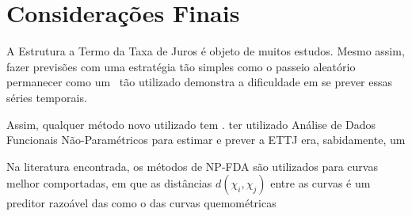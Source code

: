 \documentclass[
	12pt,				%
	openright,			%
	oneside,			%
	a4paper,			%
	english,			%
	brazil				%
	]{dissertacao-ufrgs-abntex2}
\begin{document}

%





\chapter*[Conclusão]{Considerações Finais}

A Estrutura a Termo da Taxa de Juros é objeto de muitos estudos. Mesmo assim, fazer previsões com uma estratégia tão simples como o passeio aleatório permanecer como um \bm~tão utilizado demonstra a dificuldade em se prever essas séries temporais.

Assim, qualquer método novo utilizado tem . 
ter utilizado Análise de Dados Funcionais Não-Paramétricos para estimar e prever a ETTJ era, sabidamente, um

Na literatura encontrada, os métodos de NP-FDA são utilizados para curvas melhor comportadas, em que as distâncias $d(\chi_i,\chi_j)$ entre as curvas é um preditor razoável das  como o das curvas quemométricas
\end{document}

